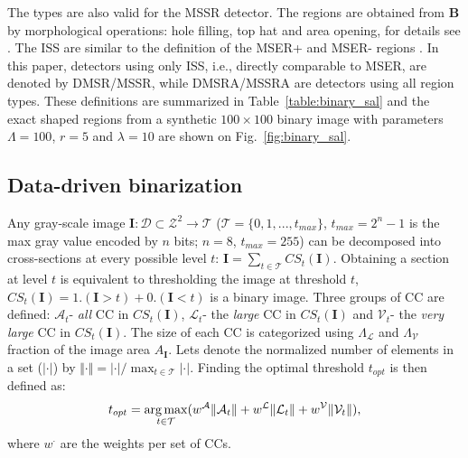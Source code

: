 \documentclass{article}
\def\B{{\mathbf B}}
\def\I{{\mathbf I}}
\def\mcT{{\mathcal{T}}}
\def\mcD{{\mathcal{D}}}
\def\mcA{{\mathcal{A}}}
\def\mcL{{\mathcal{L}}}
\def\mcV{{\mathcal{V}}}
\DeclareMathOperator*{\argmax}{arg\,max}
\begin{document}
The types are also valid for the MSSR detector. The regions are obtained from $\B$ by morphological operations: hole filling, top hat and area opening, for details see \cite{RangMSSR06, RangHumpb06}. The ISS are similar to the definition of the MSER+ and MSER- regions \cite{Matas2002BMVC}. In this paper, detectors using only ISS, i.e., directly comparable to MSER, are denoted by DMSR/MSSR, while DMSRA/MSSRA are detectors using all region types. These definitions are summarized in Table~\ref{table:binary_sal} and the exact shaped regions from a synthetic $100 \times 100$ binary image with parameters $\Lambda=100$, $r=5$ and $\lambda = 10$ are shown on Fig.~\ref{fig:binary_sal}.

\subsection{Data-driven binarization}
\label{ssec:binarize}
Any gray-scale image  $\I: \mcD \subset \mathcal{Z}^2 \rightarrow \mcT $ ($\mcT = \{0,1, ..., t_{max}\}$, $t_{max} = 2^n-1$ is the max gray value encoded by $n$ bits; $n=8$, $t_{max}=255$) can be decomposed into cross-sections at
every possible level $t$:  $\I = \sum_{t \in \mcT}CS_t(\I)$. Obtaining a section at level $t$ is equivalent to thresholding the image at threshold $t$, $CS_t(\I)= 1.(\I>t) + 0.(\I<t)$ is a binary image. 
Three groups of CC are defined: $\mcA_t$- {\em all} CC in $CS_t(\I)$, $\mcL_t$- the {\em large} CC in $CS_t(\I)$ and 
$\mcV_t$- the {\em very large} CC in $CS_t(\I)$.  The size of each CC is categorized using $\Lambda_{\mcL}$ and $\Lambda_{\mcV}$ fraction of the image area $A_{\I}$. Lets denote the normalized number of elements in a set ($|\cdot|$) by $\Vert \cdot \Vert = |\cdot| / \max_{t \in \mcT}|\cdot|$.
Finding the optimal threshold $t_{opt}$ is then defined as:
\begin{equation*}
\vspace{-0.05cm}
t_{opt} = \argmax_{t \in \mcT}( w^{\mcA} \Vert \mcA_t \Vert + w^{\mcL} \Vert \mcL_t \Vert + w^{\mcV} \Vert \mcV_t \Vert ),
\vspace{-0.05cm}
\end{equation*}
where $w^{\cdot}$ are the weights per set of CCs.  
\end{document}
